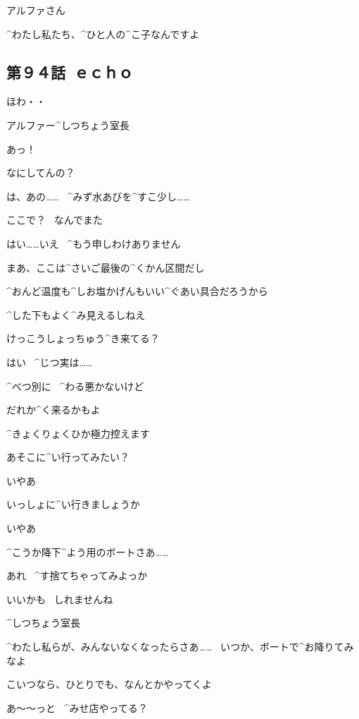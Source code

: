 \page[85]
\Kokone アルファさん

\page[86]
\Kokone ^{わたし}{私}たち、^{ひと}{人}の^{こ}{子}なんですよ


\subsection{第９４話\ ｅｃｈｏ}

\page[89]
\Alpha ほわ・・

\page[95]
\Person アルファー^{しつちょう}{室長}

\ASevenMOne あっ！

\Person なにしてんの？

\ASevenMOne は、あの……
\ ^{みず}{水}あびを^{すこ}{少}し……

\Person ここで？
\ なんでまた

\ASevenMOne はい……いえ
\ ^{もう}{申}しわけありません

\page[96]
\Person まあ、ここは^{さいご}{最後}の^{くかん}{区間}だし

\Person ^{おんど}{温度}も^{しお}{塩}かげんもいい^{ぐあい}{具合}だろうから

\Person ^{した}{下}もよく^{み}{見}えるしねえ

\Person けっこうしょっちゅう^{き}{来}てる？

\ASevenMOne はい
\ ^{じつ}{実}は……

\Person ^{べつ}{別}に
\ ^{わる}{悪}かないけど

\Person だれか^{く}{来}るかもよ

\ASevenMOne ^{きょくりょくひか}{極力控}えます

\page[97]
\Person あそこに^{い}{行}ってみたい？

\ASevenMOne いやあ

\ASevenMOne いっしょに^{い}{行}きましょうか

\Person いやあ

\page[98]
\Person ^{こうか}{降下}^{よう}{用}のボートさあ……

\Person あれ
\ ^{す}{捨}てちゃってみよっか

\ASevenMOne いいかも
\ しれませんね

\page[99]
\Person ^{しつちょう}{室長}

\Person ^{わたし}{私}らが、みんないなくなったらさあ……
\ いつか、ボートで^{お}{降}りてみなよ

\Person こいつなら、ひとりでも、なんとかやってくよ

\page[102]
\Person あ〜〜っと
\ ^{みせ}{店}やってる？

